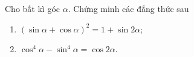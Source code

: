 \begin{bt}
\begin{bt}%
	Cho bất kì góc $\alpha$. Chứng minh các đẳng thức sau
	\begin{enumerate}
		\item $\left(\sin \alpha+\cos\alpha\right)^2=1+\sin 2\alpha$;
		\item $\cos^4\alpha-\sin^4\alpha=\cos 2\alpha$.
	\end{enumerate}
\end{bt}


\end{bt}
